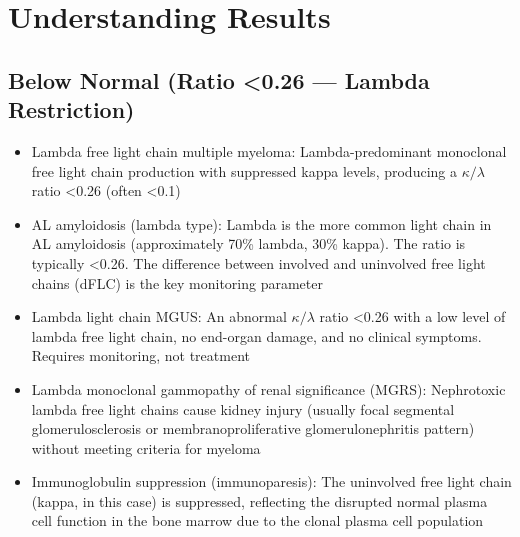 \section*{Understanding Results}

\subsection*{Below Normal (Ratio <0.26 --- Lambda Restriction)}
\begin{itemize}
  \item Lambda free light chain multiple myeloma: Lambda-predominant monoclonal free light chain production with suppressed kappa levels, producing a $\kappa/\lambda$ ratio <0.26 (often <0.1)
  \item AL amyloidosis (lambda type): Lambda is the more common light chain in AL amyloidosis (approximately 70\% lambda, 30\% kappa). The ratio is typically <0.26. The difference between involved and uninvolved free light chains (dFLC) is the key monitoring parameter
  \item Lambda light chain MGUS: An abnormal $\kappa/\lambda$ ratio <0.26 with a low level of lambda free light chain, no end-organ damage, and no clinical symptoms. Requires monitoring, not treatment
  \item Lambda monoclonal gammopathy of renal significance (MGRS): Nephrotoxic lambda free light chains cause kidney injury (usually focal segmental glomerulosclerosis or membranoproliferative glomerulonephritis pattern) without meeting criteria for myeloma
  \item Immunoglobulin suppression (immunoparesis): The uninvolved free light chain (kappa, in this case) is suppressed, reflecting the disrupted normal plasma cell function in the bone marrow due to the clonal plasma cell population
\end{itemize}

